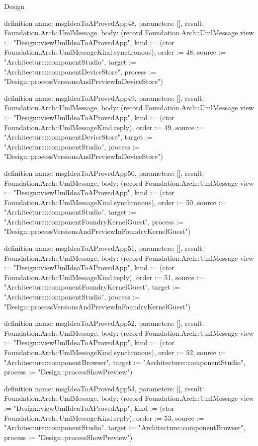 \begin{lexlean}{Design}
\begin{semanticmodule}
definition{
  name: msgIdeaToAProvedApp48,
  parameters: [],
  result: Foundation.Arch::UmlMessage,
  body: (record Foundation.Arch::UmlMessage {view := "Design::viewUmlIdeaToAProvedApp", kind := (ctor Foundation.Arch::UmlMessageKind.synchronous), order := 48, source := "Architecture::componentStudio", target := "Architecture::componentDeviceStore", process := "Design::processVersionsAndPreviewInDeviceStore"})
}

definition{
  name: msgIdeaToAProvedApp49,
  parameters: [],
  result: Foundation.Arch::UmlMessage,
  body: (record Foundation.Arch::UmlMessage {view := "Design::viewUmlIdeaToAProvedApp", kind := (ctor Foundation.Arch::UmlMessageKind.reply), order := 49, source := "Architecture::componentDeviceStore", target := "Architecture::componentStudio", process := "Design::processVersionsAndPreviewInDeviceStore"})
}

definition{
  name: msgIdeaToAProvedApp50,
  parameters: [],
  result: Foundation.Arch::UmlMessage,
  body: (record Foundation.Arch::UmlMessage {view := "Design::viewUmlIdeaToAProvedApp", kind := (ctor Foundation.Arch::UmlMessageKind.synchronous), order := 50, source := "Architecture::componentStudio", target := "Architecture::componentFoundryKernelGuest", process := "Design::processVersionsAndPreviewInFoundryKernelGuest"})
}

definition{
  name: msgIdeaToAProvedApp51,
  parameters: [],
  result: Foundation.Arch::UmlMessage,
  body: (record Foundation.Arch::UmlMessage {view := "Design::viewUmlIdeaToAProvedApp", kind := (ctor Foundation.Arch::UmlMessageKind.reply), order := 51, source := "Architecture::componentFoundryKernelGuest", target := "Architecture::componentStudio", process := "Design::processVersionsAndPreviewInFoundryKernelGuest"})
}

definition{
  name: msgIdeaToAProvedApp52,
  parameters: [],
  result: Foundation.Arch::UmlMessage,
  body: (record Foundation.Arch::UmlMessage {view := "Design::viewUmlIdeaToAProvedApp", kind := (ctor Foundation.Arch::UmlMessageKind.synchronous), order := 52, source := "Architecture::componentBrowser", target := "Architecture::componentStudio", process := "Design::processShowPreview"})
}

definition{
  name: msgIdeaToAProvedApp53,
  parameters: [],
  result: Foundation.Arch::UmlMessage,
  body: (record Foundation.Arch::UmlMessage {view := "Design::viewUmlIdeaToAProvedApp", kind := (ctor Foundation.Arch::UmlMessageKind.reply), order := 53, source := "Architecture::componentStudio", target := "Architecture::componentBrowser", process := "Design::processShowPreview"})
}


\end{semanticmodule}
\end{lexlean}

